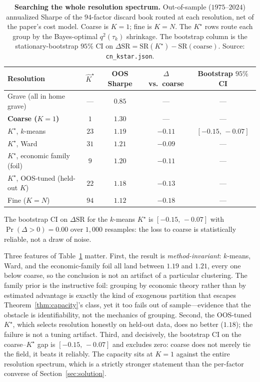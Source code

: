 \documentclass[12pt]{article}
\theoremstyle{plain}
\theoremstyle{definition}
\begin{document}
\begin{table}[t]
\centering
\caption{\textbf{Searching the whole resolution spectrum.} Out-of-sample
($1975$--$2024$) annualized Sharpe of the $94$-factor discard book routed at each
resolution, net of the paper's cost model. Coarse is $K=1$; fine is $K=N$. The
$K^\star$ rows route each group by the Bayes-optimal $q^2(\tau_k)$ shrinkage. The
bootstrap column is the stationary-bootstrap $95\%$ CI on
$\Delta\mathrm{SR}=\mathrm{SR}(K^\star)-\mathrm{SR}(\text{coarse})$. Source:
\texttt{cn\_kstar.json}.}
\label{tab:kstar}
\small
\begin{threeparttable}
\begin{tabular}{lcccc}
\toprule
Resolution & $\hat K^\star$ & OOS Sharpe & $\Delta$ vs.\ coarse & Bootstrap $95\%$ CI \\
\midrule
Grave (all in home grave)      & ---  & $0.85$ & --- & --- \\
\textbf{Coarse ($K=1$)}        & $1$  & $\mathbf{1.30}$ & --- & --- \\
$K^\star$, $k$-means           & $23$ & $1.19$ & $-0.11$ & $[-0.15,\,-0.07]$ \\
$K^\star$, Ward                & $31$ & $1.21$ & $-0.09$ & --- \\
$K^\star$, economic family (foil) & $9$ & $1.20$ & $-0.11$ & --- \\
$K^\star$, OOS-tuned (held-out $K$) & $22$ & $1.18$ & $-0.13$ & --- \\
Fine ($K=N$)                   & $94$ & $1.12$ & $-0.18$ & --- \\
\bottomrule
\end{tabular}
\begin{tablenotes}\footnotesize
\item The bootstrap CI on $\Delta\mathrm{SR}$ for the $k$-means $K^\star$ is
$[-0.15,\,-0.07]$ with $\Pr(\Delta>0)=0.00$ over $1{,}000$ resamples: the loss to
coarse is statistically reliable, not a draw of noise.
\end{tablenotes}
\end{threeparttable}
\end{table}

Three features of Table~\ref{tab:kstar} matter. First, the result is
\emph{method-invariant}: $k$-means, Ward, and the economic-family foil all land
between $1.19$ and $1.21$, every one below coarse, so the conclusion is not an
artifact of a particular clustering. The family prior is the instructive foil:
grouping by economic theory rather than by estimated advantage is exactly the
kind of exogenous partition that escapes Theorem~\ref{thm:capacity}'s class, yet
it too fails out of sample---evidence that the obstacle is identifiability, not
the mechanics of grouping. Second, the OOS-tuned $K^\star$, which selects
resolution honestly on held-out data, does no better ($1.18$); the failure is not
a tuning artifact. Third, and decisively, the bootstrap CI on the coarse--$K^\star$
gap is $[-0.15,\,-0.07]$ and excludes zero: coarse does not merely tie the field,
it beats it reliably. The capacity sits at $K=1$ against the entire resolution
spectrum, which is a strictly stronger statement than the per-factor converse of
Section~\ref{sec:solution}.
\end{document}
